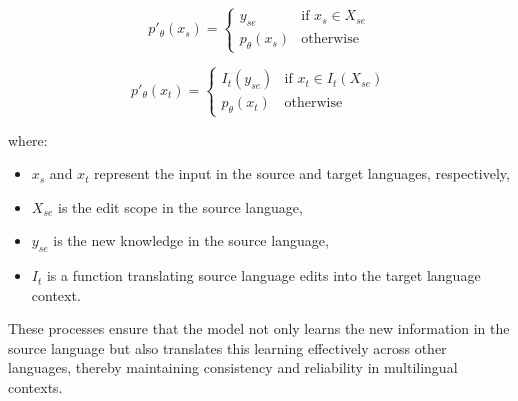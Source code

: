 \begin{equation}
p'_{\theta}(x_s) = 
\begin{cases} 
	y_{se} & \text{if } x_s \in X_{se} \\
	p_{\theta}(x_s) & \text{otherwise}
\end{cases}
\end{equation}

\begin{equation}
p'_{\theta}(x_t) = 
\begin{cases} 
	I_t(y_{se}) & \text{if } x_t \in I_t(X_{se}) \\
	p_{\theta}(x_t) & \text{otherwise}
\end{cases}
\end{equation}

where:
\begin{itemize}
	\item \(x_s\) and \(x_t\) represent the input in the source and target languages, respectively,
	\item \(X_{se}\) is the edit scope in the source language,
	\item \(y_{se}\) is the new knowledge in the source language,
	\item \(I_t\) is a function translating source language edits into the target language context.
\end{itemize}

These processes ensure that the model not only learns the new information in the source language but also translates this learning effectively across other languages, thereby maintaining consistency and reliability in multilingual contexts.

